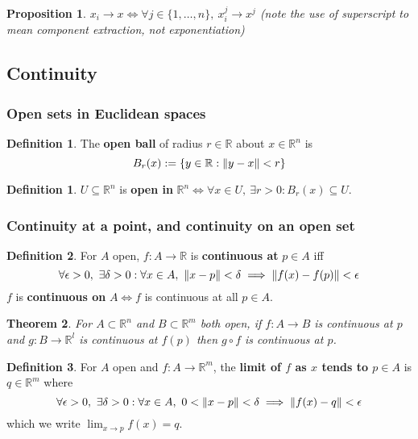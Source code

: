 \documentclass[12pt]{article}
\newtheorem{thm}{Theorem}[section]
\newtheorem{prop}[thm]{Proposition}
\theoremstyle{definition}
\newtheorem{defn}{Definition}[section]
\newtheorem*{defn*}{Definition}
\DeclarePairedDelimiter\length{\lVert}{\rVert}
\newcommand{\R}{\mathbb{R}}
\begin{document}
\begin{prop}
  $x_i \to x \iff \forall j \in \{1, \ldots, n\},\ x_i^j \to x^j$ (note the use of superscript to mean component extraction, not exponentiation)
\end{prop}

\subsection{Continuity}

\subsubsection{Open sets in Euclidean spaces}

\begin{defn*}
  The \textbf{open ball} of radius $r \in \R$ about $x \in \R^n$ is
  $$B_r(x) := \{ y \in \R : \length{y - x} < r \}$$
\end{defn*}

\begin{defn}
  $U \subseteq \R^n$ is \textbf{open in} $\R^n \iff \forall x \in U,\ \exists r > 0 : B_r(x) \subseteq U$.
\end{defn}

\subsubsection{Continuity at a point, and continuity on an open set}

\begin{defn}
  For $A$ open, $f : A \to \R$ is \textbf{continuous at} $p \in A$ iff
  $$\forall \epsilon > 0,\ \exists \delta > 0 : \forall x \in A,\ \length{x - p} < \delta \implies \length{f(x) - f(p)} < \epsilon$$
  $f$ is \textbf{continuous on} $A \iff f$ is continuous at all $p \in A$.
\end{defn}

\begin{thm}
  For $A \subset \R^n$ and $B \subset \R^m$ both open, if $f : A \to B$ is continuous at $p$ and $g : B \to \R^l$ is continuous at $f(p)$ then $g \circ f$ is continuous at $p$.
\end{thm}

\begin{defn}
  For $A$ open and $f : A \to \R^m$, the \textbf{limit of $f$ as $x$ tends to $p \in A$} is $q \in \R^m$ where
  $$\forall \epsilon > 0,\ \exists \delta > 0 : \forall x \in A,\ 0 < \length{x - p} < \delta \implies \length{f(x) - q} < \epsilon$$
  which we write $\lim_{x \to p}f(x) = q$.
\end{defn}
\end{document}
